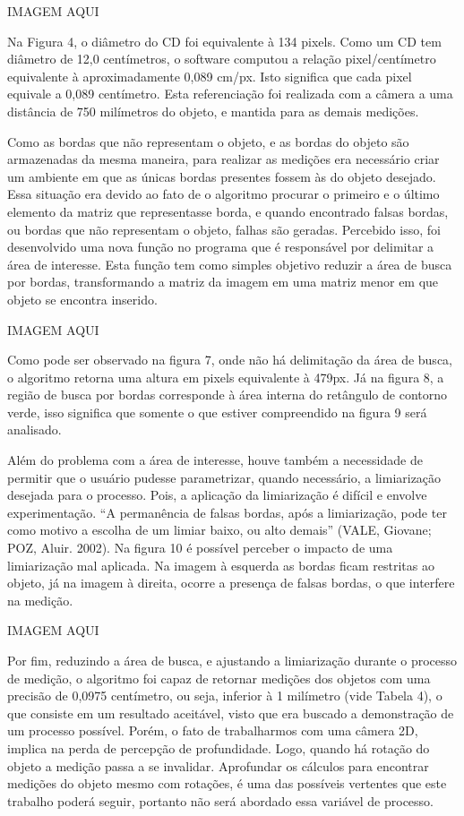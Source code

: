 \documentclass[12pt]{article}
\begin{document}
	IMAGEM AQUI
	
	Na Figura 4, o diâmetro do CD foi equivalente à 134 pixels. Como um CD tem diâmetro de 12,0 centímetros, o software computou a relação pixel/centímetro equivalente à aproximadamente 0,089 cm/px. Isto significa que cada pixel equivale a 0,089 centímetro. Esta referenciação foi realizada com a câmera a uma distância de 750 milímetros do objeto, e mantida para as demais medições.
	
	Como as bordas que não representam o objeto, e as bordas do objeto são armazenadas da mesma maneira, para realizar as medições era necessário criar um ambiente em que as únicas bordas presentes fossem às do objeto desejado. Essa situação era devido ao fato de o algoritmo procurar o primeiro e o último elemento da matriz que representasse borda, e quando encontrado falsas bordas, ou bordas que não representam o objeto, falhas são geradas. Percebido isso, foi desenvolvido uma nova função no programa que é responsável por delimitar a área de interesse. Esta função tem como simples objetivo reduzir a área de busca por bordas, transformando a matriz da imagem em uma matriz menor em que objeto se encontra inserido.
	
	IMAGEM AQUI 
	
	Como pode ser observado na figura 7, onde não há delimitação da área de busca, o algoritmo retorna uma altura em pixels equivalente à 479px. Já na figura 8, a região de busca por bordas corresponde à área interna do retângulo de contorno verde, isso significa que somente o que estiver compreendido na figura 9 será analisado.
	
	Além do problema com a área de interesse, houve também a necessidade de permitir que o usuário pudesse parametrizar, quando necessário, a limiarização desejada para o processo. Pois, a aplicação da limiarização é difícil e envolve experimentação. “A permanência de falsas bordas, após a limiarização, pode ter como motivo a escolha de um limiar baixo, ou alto demais” (VALE, Giovane; POZ, Aluir. 2002). Na figura 10 é possível perceber o impacto de uma limiarização mal aplicada. Na imagem à esquerda as bordas ficam restritas ao objeto, já na imagem à direita, ocorre a presença de falsas bordas, o que interfere na medição.
	
	IMAGEM AQUI
	
	Por fim, reduzindo a área de busca, e ajustando a limiarização durante o processo de medição, o algoritmo foi capaz de retornar medições dos objetos com uma precisão de  0,0975 centímetro, ou seja, inferior à 1 milímetro (vide Tabela 4), o que consiste em um resultado aceitável, visto que era buscado a demonstração de um processo possível. Porém, o fato de trabalharmos com uma câmera 2D, implica na perda de percepção de profundidade. Logo, quando há rotação do objeto a medição passa a se invalidar. Aprofundar os cálculos para encontrar medições do objeto mesmo com rotações, é uma das possíveis vertentes que este trabalho poderá seguir, portanto não será abordado essa variável de processo. 
	
\end{document}
